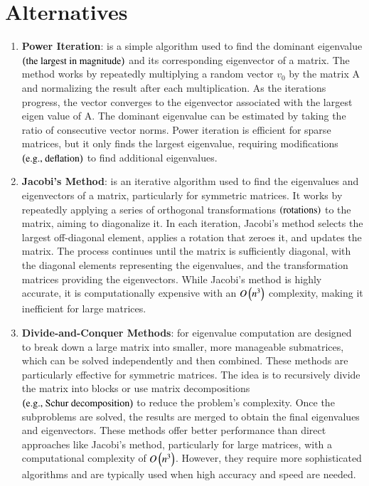 \documentclass[journal]{IEEEtran}
\numberwithin{equation}{enumi}
\numberwithin{figure}{enumi}
\begin{document}
\section{\textbf{Alternatives}}
\begin{enumerate}
	\item \textbf{Power Iteration}: is a simple algorithm used to find the dominant eigenvalue $\left(\text{the largest in magnitude}\right)$ and its corresponding eigenvector of a matrix. The method works by repeatedly multiplying a random vector $v_0$ by the matrix A and normalizing the result after each multiplication. As the iterations progress, the vector converges to the eigenvector associated with the largest eigen value of A. The dominant eigenvalue can be estimated by taking the ratio of consecutive vector norms. Power iteration is efficient for sparse matrices, but it only finds the largest eigenvalue, requiring modifications $\left(\text{e.g., deflation}\right)$ to find additional eigenvalues.
	\item \textbf{Jacobi's Method}: is an iterative algorithm used to find the eigenvalues and eigenvectors of a matrix, particularly for symmetric matrices. It works by repeatedly applying a series of orthogonal transformations $\left(\text{rotations}\right)$ to the matrix, aiming to diagonalize it. In each iteration, Jacobi's method selects the largest off-diagonal element, applies a rotation that zeroes it, and updates the matrix. The process continues until the matrix is sufficiently diagonal, with the diagonal elements representing the eigenvalues, and the transformation matrices providing the eigenvectors. While Jacobi's method is highly accurate, it is computationally expensive with an $O\left(n^3\right)$ complexity, making it inefficient for large matrices.
	\item \textbf{Divide-and-Conquer Methods}: for eigenvalue computation are designed to break down a large matrix into smaller, more manageable submatrices, which can be solved independently and then combined. These methods are particularly effective for symmetric matrices. The idea is to recursively divide the matrix into blocks or use matrix decompositions $\left(\text{e.g., Schur decomposition}\right)$ to reduce the problem's complexity. Once the subproblems are solved, the results are merged to obtain the final eigenvalues and eigenvectors. These methods offer better performance than direct approaches like Jacobi's method, particularly for large matrices, with a computational complexity of $O\left(n^3\right)$. However, they require more sophisticated algorithms and are typically used when high accuracy and speed are needed.

\end{enumerate}
\end{document}
